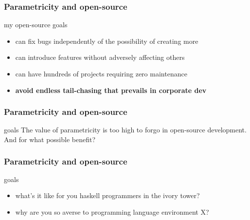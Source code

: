 \begin{frame}[fragile]
\frametitle{Parametricity and open-source}
\begin{block}{my open-source goals}
\begin{itemize}
  \item can fix bugs independently of the possibility of creating more
  \item can introduce features without adversely affecting others
  \item can have hundreds of projects requiring zero maintenance
  \item \textbf{avoid endless tail-chasing that prevails in corporate dev}
\end{itemize}
\end{block}
\end{frame}

\begin{frame}[fragile]
\frametitle{Parametricity and open-source}
\begin{block}{goals}
The value of parametricity is too high to forgo in open-source development. And for what possible benefit?
\end{block}
\end{frame}

\begin{frame}[fragile]
\frametitle{Parametricity and open-source}
\begin{block}{goals}
\begin{itemize}
  \item what's it like for you haskell programmers in the ivory tower?
  \item why are you so averse to programming language environment X?
\end{itemize}
\end{block}
\end{frame}
